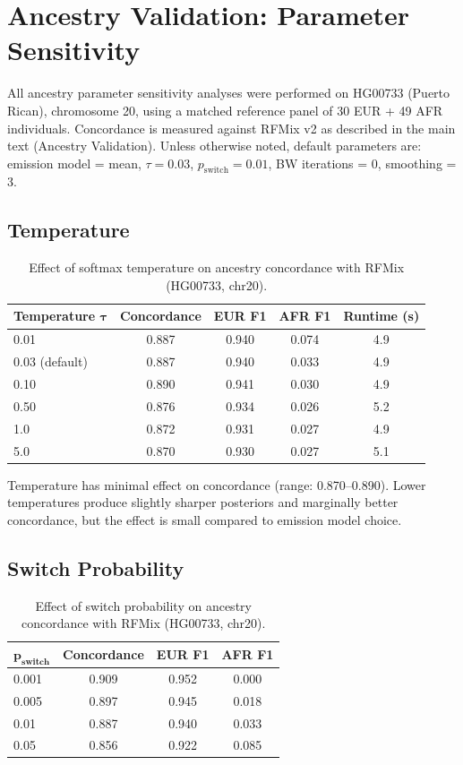 \documentclass[11pt]{article}
\begin{document}
\section{Ancestry Validation: Parameter Sensitivity}
\label{sec:supp_ancestry_sensitivity}

All ancestry parameter sensitivity analyses were performed on HG00733 (Puerto Rican), chromosome 20, using a matched reference panel of 30 EUR + 49 AFR individuals. Concordance is measured against RFMix v2 as described in the main text (Ancestry Validation). Unless otherwise noted, default parameters are: emission model = mean, $\tau = 0.03$, $p_{\text{switch}} = 0.01$, BW iterations = 0, smoothing = 3.

\subsection{Temperature}

\begin{table}[ht]
\centering
\caption{Effect of softmax temperature on ancestry concordance with RFMix (HG00733, chr20).}
\label{tab:temperature_sensitivity}
\begin{tabular}{lcccc}
\hline
\textbf{Temperature} $\boldsymbol{\tau}$ & \textbf{Concordance} & \textbf{EUR F1} & \textbf{AFR F1} & \textbf{Runtime (s)} \\
\hline
0.01 & 0.887 & 0.940 & 0.074 & 4.9 \\
0.03 (default) & 0.887 & 0.940 & 0.033 & 4.9 \\
0.10 & 0.890 & 0.941 & 0.030 & 4.9 \\
0.50 & 0.876 & 0.934 & 0.026 & 5.2 \\
1.0 & 0.872 & 0.931 & 0.027 & 4.9 \\
5.0 & 0.870 & 0.930 & 0.027 & 5.1 \\
\hline
\end{tabular}
\end{table}

Temperature has minimal effect on concordance (range: 0.870--0.890). Lower temperatures produce slightly sharper posteriors and marginally better concordance, but the effect is small compared to emission model choice.

\subsection{Switch Probability}

\begin{table}[ht]
\centering
\caption{Effect of switch probability on ancestry concordance with RFMix (HG00733, chr20).}
\label{tab:switch_sensitivity}
\begin{tabular}{lccc}
\hline
$\boldsymbol{p_{\text{switch}}}$ & \textbf{Concordance} & \textbf{EUR F1} & \textbf{AFR F1} \\
\hline
0.001 & 0.909 & 0.952 & 0.000 \\
0.005 & 0.897 & 0.945 & 0.018 \\
0.01 & 0.887 & 0.940 & 0.033 \\
0.05 & 0.856 & 0.922 & 0.085 \\
\hline
\end{tabular}
\end{table}
\end{document}
